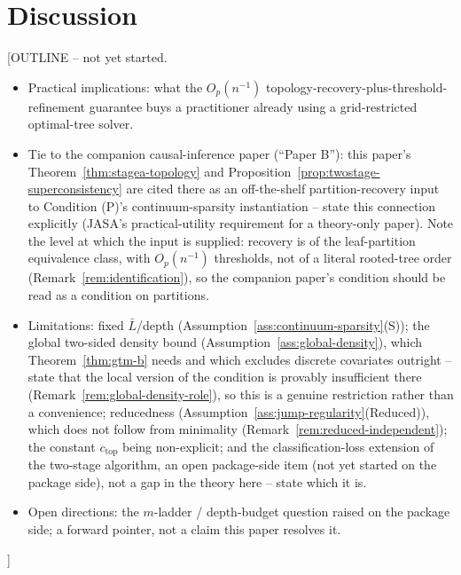 \documentclass[11pt]{article}
\theoremstyle{plain}
\theoremstyle{definition}
\theoremstyle{remark}
\begin{document}
\section{Discussion}\label{sec:discussion}
[OUTLINE -- not yet started.
\begin{itemize}
\item Practical implications: what the $O_p(n^{-1})$
  topology-recovery-plus-threshold-refinement guarantee buys a
  practitioner already using a grid-restricted optimal-tree solver.
\item Tie to the companion causal-inference paper (``Paper B''): this
  paper's Theorem~\ref{thm:stagea-topology} and
  Proposition~\ref{prop:twostage-superconsistency} are
  cited there as an off-the-shelf partition-recovery input to Condition
  (P)'s continuum-sparsity instantiation -- state this connection
  explicitly (JASA's practical-utility requirement for a theory-only
  paper). Note the level at which the input is supplied: recovery is of the
  leaf-partition equivalence class, with $O_p(n^{-1})$ thresholds, not of a
  literal rooted-tree order (Remark~\ref{rem:identification}), so the
  companion paper's condition should be read as a condition on partitions.
\item Limitations: fixed $\bar L$/depth
  (Assumption~\ref{ass:continuum-sparsity}(S)); the global two-sided density
  bound (Assumption~\ref{ass:global-density}), which
  Theorem~\ref{thm:gtm-b} needs and which excludes discrete covariates
  outright -- state that the local version of the condition is provably
  insufficient there (Remark~\ref{rem:global-density-role}), so this is a
  genuine restriction rather than a convenience; reducedness
  (Assumption~\ref{ass:jump-regularity}(Reduced)), which does not follow from
  minimality (Remark~\ref{rem:reduced-independent}); the constant
  $c_{\mathrm{top}}$ being non-explicit; and the classification-loss
  extension of the two-stage algorithm, an
  open package-side item (not yet started on the package side), not a gap
  in the theory here -- state which it is.
\item Open directions: the $m$-ladder / depth-budget question raised on
  the package side; a forward pointer, not a claim this paper resolves it.
\end{itemize}]

\renewcommand{\thesection}{S}
\renewcommand{\theHsection}{supplement.\arabic{section}}
\renewcommand{\thesubsection}{S.\arabic{subsection}}
\renewcommand{\theHsubsection}{supplement.\arabic{subsection}}
\setcounter{section}{0}
\setcounter{subsection}{0}
\end{document}
